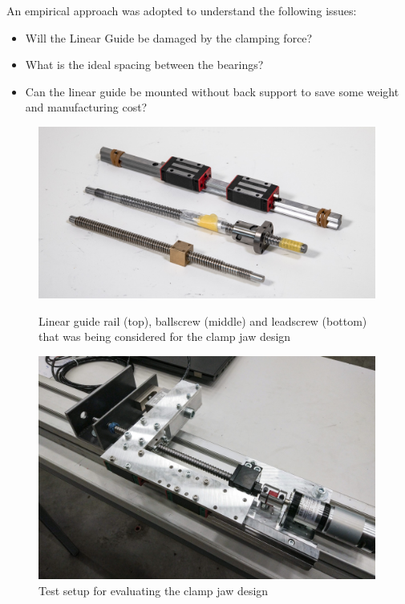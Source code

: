 An empirical approach was adopted to understand the following issues:

\begin{itemize}[nosep]
    \item Will the Linear Guide be damaged by the clamping force?
    \item What is the ideal spacing between the bearings?
    \item Can the linear guide be mounted without back support to save some weight and manufacturing cost?
\end{itemize}


\begin{figure}[!p]
    \centering
    \includegraphics[width=0.99\textwidth]{images/05/image4.jpg}
    \caption[Hardware components that was being considered for the clamp jaw design]{Linear guide rail (top), ballscrew (middle) and leadscrew (bottom) that was being considered for the clamp jaw design}
    \label{fig:clamp-jaw-redesign-components}

    \centering
    \includegraphics[width=0.99\textwidth]{images/05/image105.jpg}
    \caption{Test setup for evaluating the clamp jaw design}
    \label{fig:test-setip-for-evaluating-the-clamp-jaw-design}
\end{figure}

